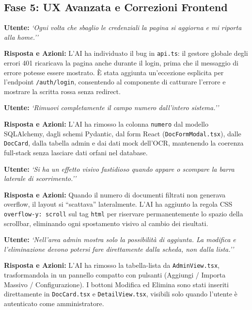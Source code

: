 \documentclass[12pt,a4paper,oneside]{report}
\begin{document}
\subsection{Fase 5: UX Avanzata e Correzioni Frontend}

\begin{promptbox}[title={Prompt 12 --- Correzione Credenziali Errate Ricaricano la Pagina}]
\textbf{Utente:} \textit{`Ogni volta che sbaglio le credenziali la pagina si aggiorna e mi riporta alla home.''}

\textbf{Risposta e Azioni:} L'AI ha individuato il bug in \texttt{api.ts}: il gestore globale degli errori 401 ricaricava la pagina anche durante il login, prima che il messaggio di errore potesse essere mostrato. È stata aggiunta un'eccezione esplicita per l'endpoint \texttt{/auth/login}, consentendo al componente di catturare l'errore e mostrare la scritta rossa senza redirect.
\end{promptbox}

\begin{promptbox}[title={Prompt 13 --- Rimozione Completa del Campo Numero Protocollo}]
\textbf{Utente:} \textit{`Rimuovi completamente il campo numero dall'intero sistema.''}

\textbf{Risposta e Azioni:} L'AI ha rimosso la colonna \texttt{numero} dal modello SQLAlchemy, dagli schemi Pydantic, dal form React (\texttt{DocFormModal.tsx}), dalle \texttt{DocCard}, dalla tabella admin e dai dati mock dell'OCR, mantenendo la coerenza full-stack senza lasciare dati orfani nel database.
\end{promptbox}

\begin{promptbox}[title={Prompt 14 --- Stabilizzazione Visiva della Barra di Scorrimento}]
\textbf{Utente:} \textit{`Si ha un effetto visivo fastidioso quando appare o scompare la barra laterale di scorrimento.''}

\textbf{Risposta e Azioni:} Quando il numero di documenti filtrati non generava overflow, il layout si ``scattava'' lateralmente. L'AI ha aggiunto la regola CSS \texttt{overflow-y: scroll} sul tag \texttt{html} per riservare permanentemente lo spazio della scrollbar, eliminando ogni spostamento visivo al cambio dei risultati.
\end{promptbox}

\begin{promptbox}[title={Prompt 15 --- Riorganizzazione Area Admin con DocCard Integrate}]
\textbf{Utente:} \textit{`Nell'area admin mostra solo la possibilità di aggiunta. La modifica e l'eliminazione devono potersi fare direttamente dalla scheda, non dalla lista.''}

\textbf{Risposta e Azioni:} L'AI ha rimosso la tabella-lista da \texttt{AdminView.tsx}, trasformandola in un pannello compatto con pulsanti (Aggiungi / Importa Massivo / Configurazione). I bottoni Modifica ed Elimina sono stati inseriti direttamente in \texttt{DocCard.tsx} e \texttt{DetailView.tsx}, visibili solo quando l'utente \`{e} autenticato come amministratore.
\end{promptbox}
\end{document}
